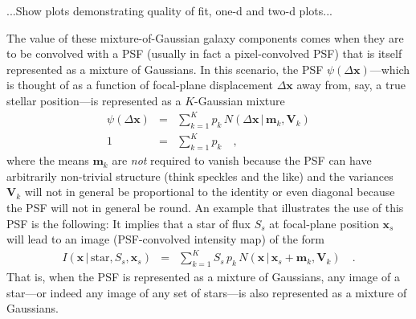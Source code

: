 \documentclass[12pt,pdftex,preprint]{aastex}
\newcommand{\tmatrix}[1]{\boldsymbol{#1}}
\newcommand{\tvector}[1]{\boldsymbol{#1}}
\newcommand{\pos}{\tvector{x}}
\newcommand{\mean}{\tvector{m}}
\newcommand{\var}{\tmatrix{V}\!}
\newcommand{\normal}{N}
\newcommand{\given}{\,|\,}
\renewcommand{\star}{\mathrm{star}}
\begin{document}
...Show plots demonstrating quality of fit, one-d and two-d plots...

The value of these mixture-of-Gaussian galaxy components comes when
they are to be convolved with a PSF (usually in fact a pixel-convolved
PSF) that is itself represented as a mixture of Gaussians.  In this
scenario, the PSF $\psi(\Delta\pos)$---which is thought of as a
function of focal-plane displacement $\Delta\pos$ away from, say, a
true stellar position---is represented as a $K$-Gaussian mixture
\begin{eqnarray}\displaystyle
\psi(\Delta\pos) &=& \sum_{k=1}^K p_k\,\normal(\Delta\pos\given\mean_k,\var_k)
\\
1 &=& \sum_{k=1}^K p_k
\quad ,
\end{eqnarray}
where the means $\mean_k$ are \emph{not} required to vanish because
the PSF can have arbitrarily non-trivial structure (think speckles and
the like) and the variances $\var_k$ will not in general be
proportional to the identity or even diagonal because the PSF will not
in general be round.  An example that illustrates the use of this PSF
is the following: It implies that a star of flux $S_s$ at focal-plane
position $\pos_s$ will lead to an image (PSF-convolved intensity map)
of the form
\begin{eqnarray}\displaystyle
I(\pos\given\star,S_s,\pos_s) &=& \sum_{k=1}^K S_s\,p_k\,\normal(\pos\given\pos_s+\mean_k,\var_k)
\quad .
\end{eqnarray}
That is, when the PSF is represented as a mixture of Gaussians, any
image of a star---or indeed any image of any set of stars---is also
represented as a mixture of Gaussians.
\end{document}
